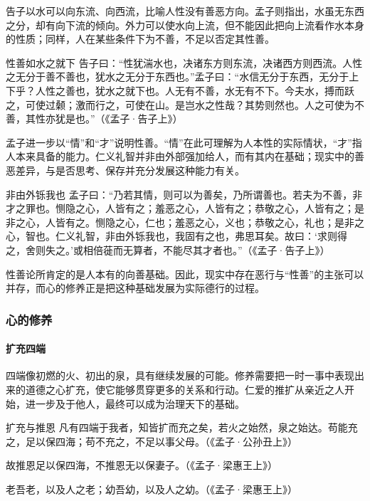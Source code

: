 告子以水可以向东流、向西流，比喻人性没有善恶方向。孟子则指出，水虽无东西之分，却有向下流的倾向。外力可以使水向上流，但不能因此把向上流看作水本身的性质；同样，人在某些条件下为不善，不足以否定其性善。

\begin{fancybox}{性善如水之就下}
    告子曰：“性犹湍水也，决诸东方则东流，决诸西方则西流。人性之无分于善不善也，犹水之无分于东西也。”孟子曰：“水信无分于东西，无分于上下乎？人性之善也，犹水之就下也。人无有不善，水无有不下。今夫水，搏而跃之，可使过颡；激而行之，可使在山。是岂水之性哉？其势则然也。人之可使为不善，其性亦犹是也。”（《孟子·告子上》）
\end{fancybox}

孟子进一步以“情”和“才”说明性善。“情”在此可理解为人本性的实际情状，“才”指人本来具备的能力。仁义礼智并非由外部强加给人，而有其内在基础；现实中的善恶差异，与是否思考、保存并充分发展这种能力有关。

\begin{fancybox}{非由外铄我也}
    孟子曰：“乃若其情，则可以为善矣，乃所谓善也。若夫为不善，非才之罪也。恻隐之心，人皆有之；羞恶之心，人皆有之；恭敬之心，人皆有之；是非之心，人皆有之。恻隐之心，仁也；羞恶之心，义也；恭敬之心，礼也；是非之心，智也。仁义礼智，非由外铄我也，我固有之也，弗思耳矣。故曰：‘求则得之，舍则失之。’或相倍蓰而无算者，不能尽其才者也。”（《孟子·告子上》）
\end{fancybox}

性善论所肯定的是人本有的向善基础。因此，现实中存在恶行与“性善”的主张可以并存，而心的修养正是把这种基础发展为实际德行的过程。

\subsubsection{心的修养}

\paragraph{扩充四端}

四端像初燃的火、初出的泉，具有继续发展的可能。修养需要把一时一事中表现出来的道德之心扩充，使它能够贯穿更多的关系和行动。仁爱的推扩从亲近之人开始，进一步及于他人，最终可以成为治理天下的基础。

\begin{fancybox}{扩充与推恩}
    凡有四端于我者，知皆扩而充之矣，若火之始然，泉之始达。苟能充之，足以保四海；苟不充之，不足以事父母。（《孟子·公孙丑上》）

    故推恩足以保四海，不推恩无以保妻子。（《孟子·梁惠王上》）

    老吾老，以及人之老；幼吾幼，以及人之幼。（《孟子·梁惠王上》）
\end{fancybox}

